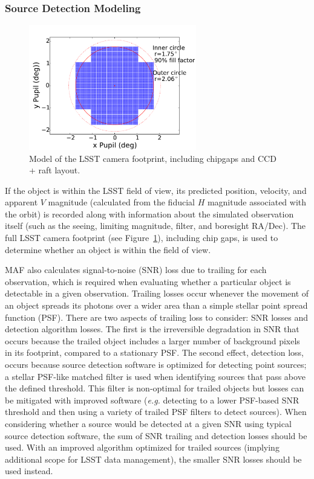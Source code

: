 \subsubsection{Source Detection Modeling}


\begin{figure}[t!]
\centering
\includegraphics[width=0.65\textwidth]{figures/focalplane}
\caption{Model of the LSST camera footprint, including chipgaps and CCD + raft layout. \label{fig:camera_footprint}}
\end{figure}

If the object is within the LSST field of view, its predicted position, velocity, and apparent $V$ magnitude (calculated from the fiducial $H$ magnitude associated with the orbit) is recorded along with information about the simulated observation itself (such as the seeing, limiting magnitude, filter, and boresight RA/Dec). The full LSST camera footprint (see Figure~\ref{fig:camera_footprint}), including chip gaps, is
used to determine whether an object is within the field of view.

MAF also calculates signal-to-noise (SNR) loss due to trailing for each observation, which is required when evaluating whether
a particular object is detectable in a given observation. Trailing losses occur whenever the movement of an object spreads its photons over a wider area than a simple stellar point spread function (PSF). There are two aspects of trailing loss to consider: SNR losses and detection algorithm losses. The first is the
irreversible degradation in SNR that occurs because the trailed object includes a larger number of background pixels in its footprint, compared to a stationary PSF. The second effect, detection loss, occurs because source detection software is optimized for detecting point sources; a stellar PSF-like matched filter is used when identifying sources that pass above the defined threshold. This filter is non-optimal for trailed objects but losses can be mitigated with improved software ({\it e.g.} detecting to a lower PSF-based SNR threshold and then using a variety of trailed PSF filters to detect sources). When considering whether a source would be detected at a given SNR using typical source detection software, the sum of SNR trailing and detection losses should be used. With an improved
algorithm optimized for trailed sources (implying additional scope for LSST data management), the smaller SNR losses should be
used instead.


